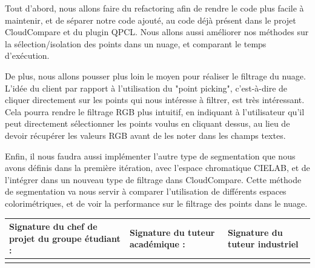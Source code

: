 \documentclass[12pt,titlepage,french]{article}
\begin{document}
Tout d'abord, nous allons faire du refactoring afin de rendre le code plus facile à maintenir, et de séparer notre code ajouté, au code déjà présent dans le projet CloudCompare et du plugin QPCL. Nous allons aussi améliorer nos méthodes sur la sélection/isolation des points dans un nuage, et comparant le temps d'exécution.

De plus, nous allons pousser plus loin le moyen pour réaliser le filtrage du nuage. L'idée du client par rapport à l'utilisation du "point picking", c'est-à-dire de cliquer directement sur les points qui nous intéresse à filtrer, est très intéressant. Cela pourra rendre le filtrage RGB plus intuitif, en indiquant à l'utilisateur qu'il peut directement sélectionner les points voulus en cliquant dessus, au lieu de devoir récupérer les valeurs RGB avant de les noter dans les champs textes.

Enfin, il nous faudra aussi implémenter l'autre type de segmentation que nous avons définis dans la première itération, avec l'espace chromatique CIELAB, et de l'intégrer dans un nouveau type de filtrage dans CloudCompare. Cette méthode de segmentation va nous servir à comparer l'utilisation de différents espaces colorimétriques, et de voir la performance sur le filtrage des points dans le nuage.\\


\noindent\begin{tabularx}{\textwidth}{|X|X|X|}
    \hline
    \textbf{Signature du chef de projet du groupe étudiant :} & \textbf{Signature du tuteur académique :} & \textbf{Signature du tuteur industriel}\\
    \hline
   \rule{0pt}{3cm} &
    &\\
    \hline
\end{tabularx}
\end{document}
